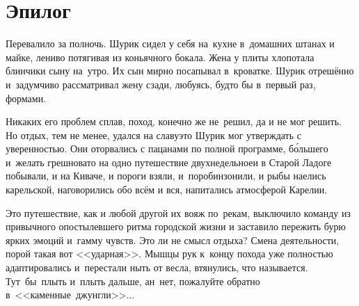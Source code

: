 
{
\cleardoublepage



\fancyhead[LE]{\fancyplain{}{}}
\fancyhead[RO]{\fancyplain{}{}}

\section*{Эпилог}


Перевалило за полночь. Шурик сидел у себя на~кухне в~домашних штанах и майке, лениво потягивая из коньячного бокала. Жена у плиты хлопотала блинчики сыну на~утро. Их сын мирно посапывал в~кроватке. Шурик отрешённо и~задумчиво рассматривал жену сзади, любуясь, будто бы в~первый раз, формами. 

Никаких его проблем сплав, поход, конечно же не~решил, да и не мог решить. Но отдых, тем не менее, удался на славу\mdash это Шурик мог утверждать с уверенностью. Они оторвались с пацанами по полной программе, б\'{о}льшего и~желать грешновато на одно путешествие двухнедельное\mdash и в Старой Ладоге побывали, и на Киваче, и пороги взяли, и~поробинзонили, и рыбы наелись карельской, наговорились обо всём и вся, напитались атмосферой Карелии.

Это путешествие, как и любой другой их вояж по~рекам, выключило команду из привычного опостылевшего ритма городской жизни и заставило пережить бурю ярких эмоций и~гамму чувств. Это ли не смысл отдыха? Смена деятельности, порой такая вот <<ударная>>. Мышцы рук к~концу похода уже полностью адаптировались и~перестали ныть от весла, втянулись, что называется. Тут~бы~плыть и~плыть дальше, ан~нет, пожалуйте обратно в~<<каменные~джунгли>>$\ldots$

}
